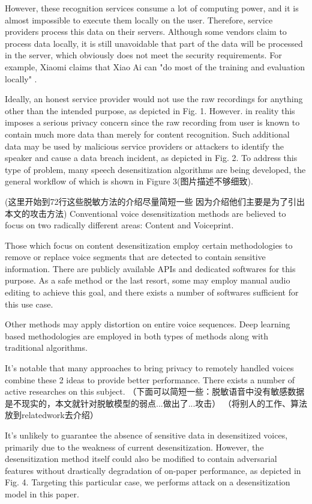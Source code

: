 \documentclass[journal]{IEEEtran} %
\begin{document}
\begin{CJK*}{UTF8}{gbsn}
However, these recognition services consume a lot of computing power, and it is almost impossible to execute them locally on the user. Therefore, service providers process this data on their servers. Although some vendors claim to process data locally, it is still unavoidable that part of the data will be processed in the server, which obviously does not meet the security requirements. For example, Xiaomi claims that Xiao Ai can "do most of the training and evaluation locally" \cite{a20}.

Ideally, an honest service provider would not use the raw recordings for anything other than the intended purpose, as depicted in Fig. 1.
However. in reality this imposes a serious privacy concern since the raw recording from user is known to contain much more data than merely for content recognition. Such additional data may be used by malicious service providers or attackers to identify the speaker and cause a data breach incident, as depicted in Fig. 2. To address this type of problem, many speech desensitization algorithms are being developed, the general workflow of which is shown in Figure 3(图片描述不够细致).

(这里开始到72行这些脱敏方法的介绍尽量简短一些
因为介绍他们主要是为了引出本文的攻击方法)
Conventional voice desensitization methods are believed to focus on two radically different areas: Content and Voiceprint.

Those which focus on content desensitization employ certain methodologies to remove or replace voice segments that are detected to contain sensitive information. There are publicly available APIs\cite{a13} and dedicated softwares for this purpose\cite{a14}. As a safe method or the last resort, some may employ manual audio editing to achieve this goal, and there exists a number of softwares sufficient for this use case\cite{a15}.

Other methods may apply distortion on entire voice sequences. Deep learning based methodologies are employed in both types of methods along with traditional algorithms\cite{a9, a10, a11}.

It's notable that many approaches to bring privacy to remotely handled voices combine these 2 ideas to provide better performance. There exists a number of active researches on this subject\cite{a8}.
（下面可以简短一些：脱敏语音中没有敏感数据是不现实的，本文就针对脱敏模型的弱点...做出了...攻击）
（将别人的工作、算法放到relatedwork去介绍）

It's unlikely to guarantee the absence of sensitive data in desensitized voices, primarily due to the weakness of current desensitization. However, the desensitization method itself could also be modified to contain adversarial features without drastically degradation of on-paper performance\cite{a1}, as depicted in Fig. 4. Targeting this particular case, we performs attack on a desensitization model in this paper.


\end{CJK*}
\end{document}
